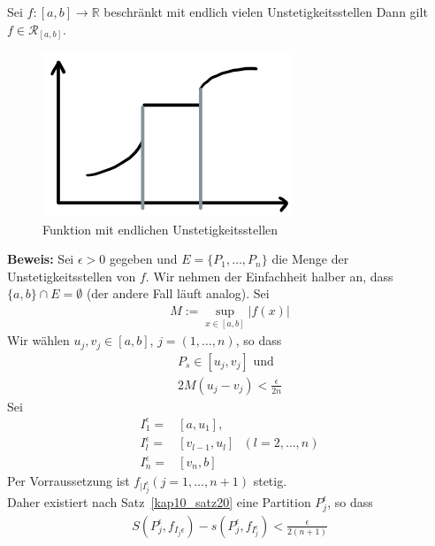\begin{Satz}{\label{kap10_satz21}
	Sei $f: [a,b] \rightarrow \mathbb{R}$ beschränkt mit endlich vielen 
	Unstetigkeitsstellen %
	Dann gilt $f \in \mathcal{R}_{[a,b]}$.\\
	\begin{figure}[ht]
		\begin{center}
			\includegraphics[scale=0.5]{./skizzen/plot_fkt_unstetigkeitsstellen}
		\end{center}
		\caption{Funktion mit endlichen Unstetigkeitsstellen}
		\label{plot_fkt_unstetigketsstellen}
	\end{figure}
	\textbf{Beweis:} Sei $\epsilon > 0$ gegeben und $E = \{P_1, \hdots, P_n\}$
	die Menge der Unstetigkeitsstellen von $f$. Wir nehmen der Einfachheit halber 
	an, dass $\{a,b\} \cap E = \emptyset$ (der andere Fall läuft analog).
	Sei
	\begin{align*}
		 M:= \sup_{x \in [a,b]} \vert f(x) \vert
	\end{align*}
	 Wir wählen $u_j, v_j \in [a,b]$, 
	$j = (1, \hdots, n)$, so dass
	\begin{align*}
		P_s \in [u_j, v_j] \text{ und} \\
		2M (u_j - v_j) < \frac{\epsilon}{2n}
	\end{align*}		
	 Sei 
	 \begin{align*}
		I_1^{\epsilon} = & [a, u_1], \\
		 I_l^{\epsilon} = & [v_{l-1}, u_l] \text{ }  (l = 2, \hdots, n) \\
		 I_n^{\epsilon} = & [v_n, b]
	 \end{align*}
	Per Vorraussetzung ist $f_{\vert I_j^{\epsilon}} (j = 1,\hdots, n+1)$ stetig. \\
	Daher existiert nach Satz~\ref{kap10_satz20}
	eine Partition $P_j^{\epsilon}$, so dass 
	\begin{align*}
		S(P_j^{\epsilon}, f_{I_j{\epsilon}}) - s(P_j^{\epsilon}, f_{I_j^{\epsilon}}) 
		 < \frac{\epsilon}{2(n+1)}
	\end{align*}
}
\end{Satz}
